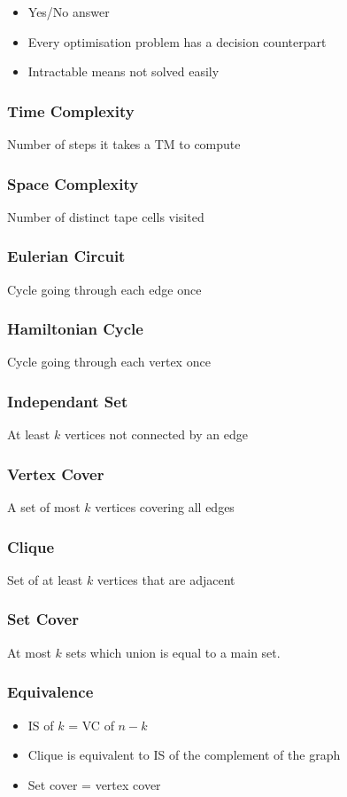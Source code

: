 \begin{itemize}
    \item Yes/No answer
    \item Every optimisation problem has a decision counterpart
    \item Intractable means not solved easily
\end{itemize}

\subsubsection{Time Complexity}
Number of steps it takes a TM to compute

\subsubsection{Space Complexity}
Number of distinct tape cells visited

\subsubsection{Eulerian Circuit}
Cycle going through each edge once

\subsubsection{Hamiltonian Cycle}
Cycle going through each vertex once

\subsubsection{Independant Set}
At least $k$ vertices not connected by an edge

\subsubsection{Vertex Cover}
A set of most $k$ vertices covering all edges

\subsubsection{Clique}
Set of at least $k$ vertices that are adjacent

\subsubsection{Set Cover}
At most $k$ sets which union is equal to a main set.

\subsubsection{Equivalence}
\begin{itemize}
    \item IS of $k$ = VC of $n-k$
    \item Clique is equivalent to IS of the complement of the graph
    \item Set cover = vertex cover
\end{itemize}


